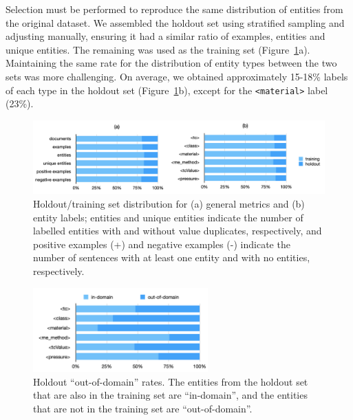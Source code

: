 Selection must be performed to reproduce the same distribution of entities from the original dataset.
We assembled the holdout set using stratified sampling and adjusting manually, ensuring it had a similar ratio of examples, entities and unique entities. The remaining was used as the training set (Figure~\ref{fig:training-holdout-set-distribution}a).
Maintaining the same rate for the distribution of entity types between the two sets was more challenging. On average, we obtained approximately 15-18\% labels of each type in the holdout set (Figure~\ref{fig:training-holdout-set-distribution}b), except for the \texttt{<material>} label (23\%). 

\begin{figure}[ht]
    \centering
    \includegraphics[width=\textwidth]{figures/automatic_extraction_supercon/superconductor-holdout-training-set}
    \caption{Holdout/training set distribution for (a) general metrics and (b) entity labels; entities and unique entities indicate the number of labelled entities with and without value duplicates, respectively, and positive examples (+) and negative examples (-) indicate the number of sentences with at least one entity and with no entities, respectively.}
    \label{fig:training-holdout-set-distribution}
\end{figure}

\begin{figure}[ht]
    \centering
    \includegraphics[width=0.6\textwidth]{figures/automatic_extraction_supercon/superconductor-out-domain-holdout-unique}
    \caption{Holdout ``out-of-domain'' rates. The entities from the holdout set that are also in the training set are ``in-domain'', and the entities that are not in the training set are ``out-of-domain''.}
    \label{fig:out-domain-holdout}
\end{figure}

